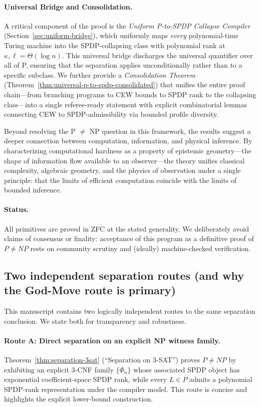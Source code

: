 \documentclass[12pt]{article}
\theoremstyle{definition}
\theoremstyle{definition}
\theoremstyle{remark}
\theoremstyle{remark}
\begin{document}
\paragraph{Universal Bridge and Consolidation.}
A critical component of the proof is the \emph{Uniform P-to-SPDP Collapse Compiler} (Section~\ref{sec:uniform-bridge}), which uniformly maps \emph{every} polynomial-time Turing machine into the SPDP-collapsing class with polynomial rank at $\kappa,\ell = \Theta(\log n)$. This universal bridge discharges the universal quantifier over all of P, ensuring that the separation applies unconditionally rather than to a specific subclass. We further provide a \emph{Consolidation Theorem} (Theorem~\ref{thm:universal-p-to-spdp-consolidated}) that unifies the entire proof chain---from branching programs to CEW bounds to SPDP rank to the collapsing class---into a single referee-ready statement with explicit combinatorial lemmas connecting CEW to SPDP-admissibility via bounded profile diversity.

Beyond resolving the P $\neq$ NP question in this framework, the results suggest a deeper connection between computation, information, and physical inference. By characterizing computational hardness as a property of epistemic geometry---the shape of information flow available to an observer---the theory unifies classical complexity, algebraic geometry, and the physics of observation under a single principle: that the limits of efficient computation coincide with the limits of bounded inference.

\paragraph{Status.}
All primitives are proved in ZFC at the stated generality. We deliberately avoid claims of consensus or finality: acceptance of this program as a definitive proof of $P\neq NP$ rests on community scrutiny and (ideally) machine-checked verification.

\subsection{Two independent separation routes (and why the God-Move route is primary)}
\label{subsec:two-routes}

This manuscript contains two logically independent routes to the same separation
conclusion. We state both for transparency and robustness.

\paragraph{Route A: Direct separation on an explicit NP witness family.}
Theorem~\ref{thm:separation-3sat} (``Separation on 3-SAT'') proves $P\neq NP$
by exhibiting an explicit 3-CNF family $\{\Phi_n\}$ whose associated SPDP object
has exponential coefficient-space SPDP rank, while every $L\in P$ admits a
polynomial SPDP-rank representation under the compiler model.
This route is concise and highlights the explicit lower-bound construction.
\end{document}
